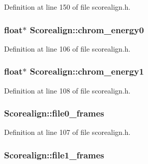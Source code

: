Definition at line 150 of file scorealign.\+h.

\subsubsection[{\texorpdfstring{chrom\+\_\+energy0}{chrom_energy0}}]{\setlength{\rightskip}{0pt plus 5cm}float$\ast$ Scorealign\+::chrom\+\_\+energy0}\hypertarget{class_scorealign_a65e1070af091985304c02797ce210170}{}\label{class_scorealign_a65e1070af091985304c02797ce210170}


Definition at line 106 of file scorealign.\+h.

\subsubsection[{\texorpdfstring{chrom\+\_\+energy1}{chrom_energy1}}]{\setlength{\rightskip}{0pt plus 5cm}float$\ast$ Scorealign\+::chrom\+\_\+energy1}\hypertarget{class_scorealign_ac094f1c6ed01fb8f9988bec933208bde}{}\label{class_scorealign_ac094f1c6ed01fb8f9988bec933208bde}


Definition at line 108 of file scorealign.\+h.

\subsubsection[{\texorpdfstring{file0\+\_\+frames}{file0_frames}}]{ Scorealign\+::file0\+\_\+frames}\hypertarget{class_scorealign_a43bab7477ee687ed17d676a81c3e9ced}{}\label{class_scorealign_a43bab7477ee687ed17d676a81c3e9ced}


Definition at line 107 of file scorealign.\+h.

\subsubsection[{\texorpdfstring{file1\+\_\+frames}{file1_frames}}]{ Scorealign\+::file1\+\_\+frames}\hypertarget{class_scorealign_ab0ea5cd44003743384ac8e39752155cb}{}\label{class_scorealign_ab0ea5cd44003743384ac8e39752155cb}


